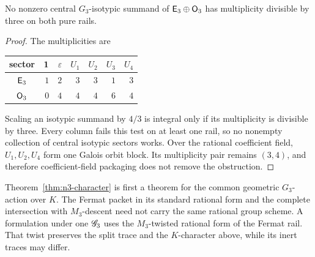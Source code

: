 \begin{corollary}
\label{cor:no-central-sector}
No nonzero central \(G_3\)-isotypic summand of
\(\mathsf E_3\oplus\mathsf O_3\) has multiplicity divisible by three on both
pure rails.
\end{corollary}

\begin{proof}
The multiplicities are
\begin{center}
\begin{tabular}{@{}c|rrrrrr@{}}
\toprule
sector & \(\mathbf 1\) & \(\varepsilon\) & \(U_1\) & \(U_2\) & \(U_3\) & \(U_4\)\\
\midrule
\(\mathsf E_3\) & \(1\) & \(2\) & \(3\) & \(3\) & \(1\) & \(3\)\\
\(\mathsf O_3\) & \(0\) & \(4\) & \(4\) & \(4\) & \(6\) & \(4\)\\
\bottomrule
\end{tabular}
\end{center}
Scaling an isotypic summand by \(4/3\) is integral only if its
multiplicity is divisible by three.  Every column fails this test on at
least one rail, so no nonempty collection of central isotypic sectors works.
Over the rational coefficient field, \(U_1,U_2,U_4\) form one Galois
orbit block.  Its multiplicity pair remains \((3,4)\), and therefore
coefficient-field packaging does not remove the obstruction.
\end{proof}

\begin{remark}
\label{rem:common-group}
Theorem~\ref{thm:n3-character} is first a theorem for the common geometric
\(G_3\)-action over \(K\).  The Fermat packet in its standard rational
form and the complete intersection with \(M_3\)-descent need not carry the
same rational group scheme.  A formulation under one
\(\mathscr G_3\) uses the \(M_3\)-twisted rational form of the Fermat rail.
That twist preserves the split trace and the \(K\)-character above, while
its inert traces may differ.
\end{remark}
